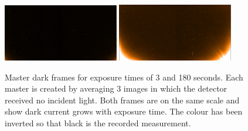 \begin{figure}[h]
    \centering
    \includegraphics[width=0.45\textwidth]{figures/reduction/MasterDarkFlat_1.png}
    \includegraphics[width=0.45\textwidth]{figures/reduction/MasterDarkSpec_1.png}
    \caption{Master dark frames for exposure times of 3 and 180 seconds. Each master is created by averaging 3 images in which the detector received no incident light. Both frames are on the same scale and show dark current grows with exposure time. The colour has been inverted so that black is the recorded measurement.}
    \label{fig:darkcurrent_colour}
\end{figure}

